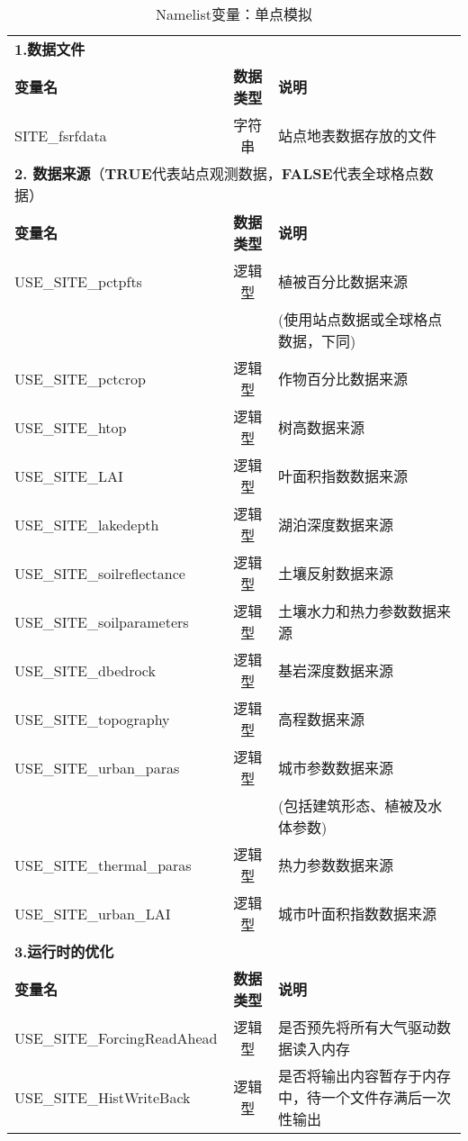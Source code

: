 \documentclass[a4paper,12pt,twoside]{article}
\begin{document}
\begin{table}[!htbp]
\caption{Namelist变量：单点模拟}
\label{table_nl_singlepoint}
\centering \renewcommand{\arraystretch}{1.5}
\begin{tabular}{lcp{}}
\toprule
\textbf{1.数据文件} & & \\
\textbf{变量名} & \textbf{数据类型} & \textbf{说明} \\
SITE\_fsrfdata & 字符串 & 站点地表数据存放的文件 \\\midrule
\multicolumn{3}{l}{\textbf{2. 数据来源}（\textbf{TRUE}代表站点观测数据，\textbf{FALSE}代表全球格点数据）} \\
\textbf{变量名} & \textbf{数据类型} & \textbf{说明} \\
USE\_SITE\_pctpfts & 逻辑型 & 植被百分比数据来源 \\
& & (使用站点数据或全球格点数据，下同) \\
USE\_SITE\_pctcrop & 逻辑型 & 作物百分比数据来源 \\
USE\_SITE\_htop & 逻辑型 & 树高数据来源 \\
USE\_SITE\_LAI & 逻辑型 & 叶面积指数数据来源 \\
USE\_SITE\_lakedepth & 逻辑型 & 湖泊深度数据来源 \\
USE\_SITE\_soilreflectance & 逻辑型 & 土壤反射数据来源 \\
USE\_SITE\_soilparameters & 逻辑型 & 土壤水力和热力参数数据来源 \\
USE\_SITE\_dbedrock & 逻辑型 & 基岩深度数据来源 \\
USE\_SITE\_topography & 逻辑型 & 高程数据来源 \\
USE\_SITE\_urban\_paras & 逻辑型 & 城市参数数据来源 \\
& &(包括建筑形态、植被及水体参数) \\
USE\_SITE\_thermal\_paras & 逻辑型 & 热力参数数据来源 \\
USE\_SITE\_urban\_LAI & 逻辑型 & 城市叶面积指数数据来源 \\
\midrule
\textbf{3.运行时的优化} & & \\
\textbf{变量名} & \textbf{数据类型} & \textbf{说明} \\
USE\_SITE\_ForcingReadAhead & 逻辑型 & 是否预先将所有大气驱动数据读入内存 \\
USE\_SITE\_HistWriteBack & 逻辑型 & 是否将输出内容暂存于内存中，待一个文件存满后一次性输出 \\
\bottomrule
\end{tabular} 
\end{table}
\end{document}
